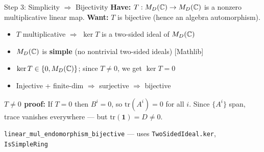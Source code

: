 \documentclass[aspectratio=169,10pt]{beamer}
\begin{document}
\begin{frame}{Step 3: Simplicity $\Rightarrow$ Bijectivity}
\vspace{-0.2em}
{\small\textbf{Have:} $T:M_D(\mathbb{C})\to M_D(\mathbb{C})$ is a nonzero multiplicative linear map.
\quad\textbf{Want:} $T$ is bijective (hence an algebra automorphism).}

\vspace{0.3em}
\begin{center}
\end{center}

\vspace{0.2em}
\begin{itemize}\itemsep0.05em
  \item {\small $T$ multiplicative $\Rightarrow$ $\ker T$ is a two-sided ideal of $M_D(\mathbb{C})$}
  \item {\small $M_D(\mathbb{C})$ is \textbf{simple} (no nontrivial two-sided ideals) \hfill \textcolor{leanblue}{[Mathlib]}}
  \item {\small $\ker T \in \{0, M_D(\mathbb{C})\}$; since $T\neq 0$, we get $\ker T = 0$}
  \item {\small Injective + finite-dim $\Rightarrow$ surjective $\Rightarrow$ bijective}
\end{itemize}

\vspace{0.2em}
{\small\textbf{$T\neq 0$ proof:}  If $T=0$ then $B^i=0$, so $\mathrm{tr}(A^i)=0$ for all $i$. Since $\{A^i\}$ span, trace vanishes everywhere --- but $\mathrm{tr}(\mathbf{1}) = D \neq 0$.}

\vspace{0.15em}
{\small\textcolor{leangreen}{\checkmark}  \texttt{linear\_mul\_endomorphism\_bijective} --- uses \texttt{TwoSidedIdeal.ker}, \texttt{IsSimpleRing}}
\end{frame}
\end{document}
